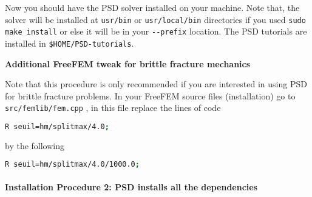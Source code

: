 Now you should have the PSD solver installed on your machine. Note that,
the solver will be installed at \lstinline!usr/bin! or
\lstinline!usr/local/bin! directories if you used
\lstinline!sudo make install! or else it will be in your
\lstinline!--prefix! location. The PSD tutorials are installed in
\lstinline!$HOME/PSD-tutorials!.

\textbf{Additional FreeFEM tweak for brittle fracture mechanics}

Note that this procedure is only recommended if you are interested in
using PSD for brittle fracture problems. In your FreeFEM source files
(installation) go to \lstinline!src/femlib/fem.cpp! , in this file
replace the lines of code

\begin{lstlisting}[language=bash]
R seuil=hm/splitmax/4.0;
\end{lstlisting}

by the following

\begin{lstlisting}[language=bash]
R seuil=hm/splitmax/4.0/1000.0;
\end{lstlisting}

\paragraph{Installation Procedure 2: PSD installs all the dependencies}

